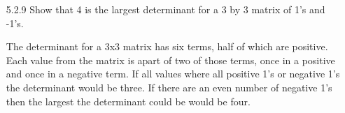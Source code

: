 \documentclass[10pt,twoside,reqno]{article}
\begin{document}
\begin{enumerate}
\item[5.2.9] Show that 4 is the largest determinant for a 3 by 3 matrix of 1's and -1's. \\
\vspace{3mm}

The determinant for a 3x3 matrix has six terms, half of which are positive. Each value from the matrix is apart of two of those terms, once in a positive and once in a negative term. If all values where all positive 1's or negative 1's the determinant would be three. If there are an even number of negative 1's then the largest the determinant could be would be four.

\vspace{3mm}


\end{enumerate}
\end{document}
